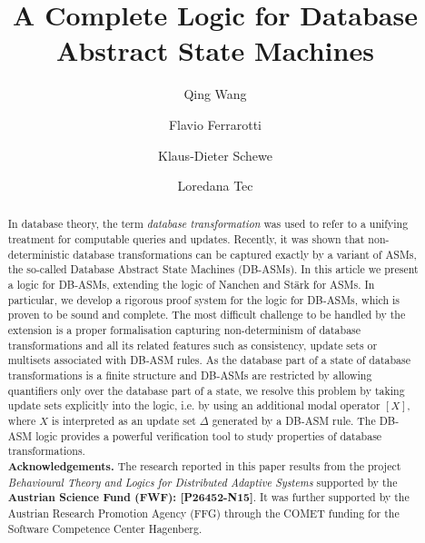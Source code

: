 \documentclass[preprint,11pt]{elsarticle}
\theoremstyle{definition}
\theoremstyle{remark}
\begin{document}
\begin{frontmatter}

\title{A Complete Logic for Database Abstract State Machines}

\author[1]{Qing Wang}
\author[2]{Flavio Ferrarotti}
\author[2]{Klaus-Dieter Schewe}
\author[2]{Loredana Tec}
 
\address[1]{Research School of Computer Science, The Australian National University, Australia, \textrm{qing.wang@anu.edu.au}}
\address[2]{Software Competence Center Hagenberg, Austria, \textrm{[flavio.ferrarotti$\mid$loredana.tec]@scch.at},\textrm{kdschewe@acm.org}}








\begin{abstract}
In database theory, the term \emph{database
transformation} was used to refer to a unifying treatment for
computable queries and updates.
Recently, it was shown that non-deterministic
database transformations can be captured exactly by a variant of
ASMs, the so-called Database Abstract State Machines (DB-ASMs). In
this article we present a logic for DB-ASMs,  extending the logic of Nanchen and St\"ark for ASMs. In particular, we
develop a rigorous proof system for the logic for DB-ASMs, which is
proven to be sound and complete. The most
difficult challenge to be handled by the extension is a proper
formalisation capturing non-determinism of database transformations
and all its related features such as consistency,
update sets or multisets associated with DB-ASM rules. As the database part of a state of database transformations is a
finite structure and DB-ASMs are restricted by allowing quantifiers only over
the database part of a state, we resolve this problem by taking update sets explicitly into the logic, i.e. by using an additional modal operator $[X]$, where $X$ is interpreted as an update set $\Delta$
generated by a DB-ASM rule. The DB-ASM logic provides a powerful
verification tool to study properties of database transformations.\\[1ex]

\noindent
{\normalsize\textbf{Acknowledgements.}} 
The research reported in this paper results
    from the project \textit{Behavioural Theory and Logics for
      Distributed Adaptive Systems} supported by the \textbf{Austrian
      Science Fund (FWF): [P26452-N15]}. It was further supported by the Austrian Research Promotion Agency (FFG) through the COMET funding for the Software Competence Center Hagenberg. 

\end{abstract}
\end{frontmatter}
\end{document}
